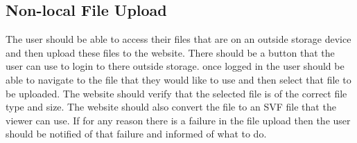 \documentclass[letterpaper, 10pt, draftclsnofoot, compsoc, onecolumn]{IEEEtran}
\begin{document}
\subsection{Non-local File Upload}
	The user should be able to  access their files that are on an outside storage device and then upload these files to the website. There should be a button that the user can use to login to there outside storage. once logged in the user should be able to navigate to the file that they would like to use and then select that file to be uploaded. The website should verify that the selected file is of the correct file type and size. The website should also convert the file to an SVF file that the viewer can use. If for any reason there is a failure in the file upload then the user should be notified of that failure and informed of what to do.
\end{document}
